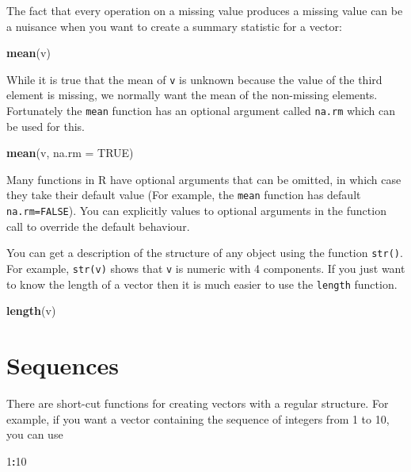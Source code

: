 \documentclass[
]{book}
\newenvironment{Shaded}{\begin{snugshade}}{\end{snugshade}}
\newcommand{\AttributeTok}[1]{\textcolor[rgb]{0.13,0.29,0.53}{#1}}
\newcommand{\ConstantTok}[1]{\textcolor[rgb]{0.56,0.35,0.01}{#1}}
\newcommand{\DecValTok}[1]{\textcolor[rgb]{0.00,0.00,0.81}{#1}}
\newcommand{\FunctionTok}[1]{\textcolor[rgb]{0.13,0.29,0.53}{\textbf{#1}}}
\newcommand{\NormalTok}[1]{#1}
\newcommand{\SpecialCharTok}[1]{\textcolor[rgb]{0.81,0.36,0.00}{\textbf{#1}}}
\begin{document}
The fact that every operation on a missing value produces a missing value
can be a nuisance when you want to create a summary statistic for a vector:

\begin{Shaded}
\begin{Highlighting}[]
\FunctionTok{mean}\NormalTok{(v)}
\end{Highlighting}
\end{Shaded}

While it is true that the mean of \texttt{v} is unknown because the value
of the third element is missing, we normally want the mean of the
non-missing elements. Fortunately the \texttt{mean} function has an
optional argument called \texttt{na.rm} which can be used for this.

\begin{Shaded}
\begin{Highlighting}[]
\FunctionTok{mean}\NormalTok{(v, }\AttributeTok{na.rm =} \ConstantTok{TRUE}\NormalTok{)}
\end{Highlighting}
\end{Shaded}

Many functions in R have optional arguments that can be omitted, in which
case they take their default value (For example, the \texttt{mean} function has
default \texttt{na.rm=FALSE}). You can explicitly values to optional arguments
in the function call to override the default behaviour.

You can get a description of the structure of any object using the
function \texttt{str()}. For example, \texttt{str(v)} shows that \texttt{v}
is numeric with 4 components. If you just want to know the length of a
vector then it is much easier to use the \texttt{length} function.

\begin{Shaded}
\begin{Highlighting}[]
\FunctionTok{length}\NormalTok{(v)}
\end{Highlighting}
\end{Shaded}

\section{Sequences}\label{sequences}

There are short-cut functions for creating vectors with a regular
structure. For example, if you want a vector containing the sequence of
integers from 1 to 10, you can use

\begin{Shaded}
\begin{Highlighting}[]
\DecValTok{1}\SpecialCharTok{:}\DecValTok{10}
\end{Highlighting}
\end{Shaded}
\end{document}
